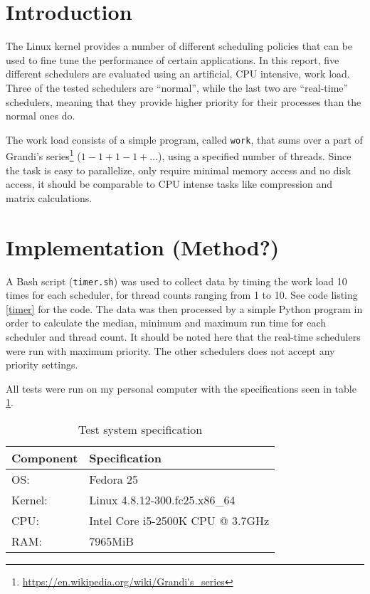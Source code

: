 \documentclass[12pt, a4paper]{article} %
\begin{document}
\section{Introduction}

The Linux kernel provides a number of different scheduling policies that can be used to fine tune the performance of certain applications.
In this report, five different schedulers are evaluated using an artificial, CPU intensive, work load.
Three of the tested schedulers are ``normal'', while the last two are ``real-time'' schedulers, meaning that they provide higher priority for their processes than the normal ones do.

The work load consists of a simple program, called \texttt{work}, that sums over a part of Grandi's series\footnote{\url{https://en.wikipedia.org/wiki/Grandi's_series}} ($1-1+1-1+\dots$), using a specified number of threads.
Since the task is easy to parallelize, only require minimal memory access and no disk access, it should be comparable to CPU intense tasks like compression and matrix calculations.

\section{Implementation (Method?)}

A Bash script (\texttt{timer.sh}) was used to collect data by timing the work load 10 times for each scheduler, for thread counts ranging from 1 to 10.
See code listing \ref{timer} for the code.
The data was then processed by a simple Python program in order to calculate the median, minimum and maximum run time for each scheduler and thread count.
It should be noted here that the real-time schedulers were run with maximum priority.
The other schedulers does not accept any priority settings.

All tests were run on my personal computer with the specifications seen in table \ref{spec}.


\begin{table}[h]
	\centering
	\begin{tabular}{ll}
		Component & Specification \\
		\hline
		OS: & Fedora 25 \\
		Kernel: & Linux 4.8.12-300.fc25.x86\_64 \\
		CPU: & Intel Core i5-2500K CPU @ 3.7GHz \\
		RAM: & 7965MiB
	\end{tabular}
	\caption{Test system specification}
	\label{spec}
\end{table}
\end{document}
